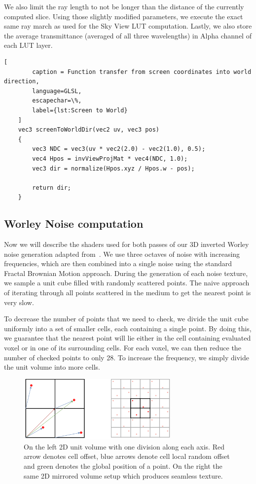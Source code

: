 \documentclass{ctuthesis}
\begin{document}
    We also limit the ray length to not be longer than the distance of the currently computed slice. 
    Using those slightly modified parameters, we execute the exact same ray march as used for the Sky View LUT
    computation. Lastly, we also store the average transmittance (averaged of all three wavelengths)
    in Alpha channel of each LUT layer. 

    \begin{lstlisting}[ 
        caption = Function transfer from screen coordinates into world direction,
        language=GLSL,
        escapechar=\%,
        label={lst:Screen to World}
    ]
    vec3 screenToWorldDir(vec2 uv, vec3 pos)
    {
        vec3 NDC = vec3(uv * vec2(2.0) - vec2(1.0), 0.5);
        vec4 Hpos = invViewProjMat * vec4(NDC, 1.0);
        vec3 dir = normalize(Hpos.xyz / Hpos.w - pos);

        return dir;
    }
    \end{lstlisting}
\subsection{Worley Noise computation}
Now we will describe the shaders used for both passes of our 3D inverted Worley noise generation adapted
from~\cite{lague_2019}. We use three octaves of noise with increasing frequencies, which are then
combined into a single noise using the standard Fractal Brownian Motion approach. During the generation
of each noise texture, we sample a unit cube filled with randomly scattered points. The naive approach 
of iterating through all points scattered in the medium to get the nearest point is very slow. 

To decrease the number of points that we need to check, we divide the unit cube uniformly into a set of smaller
cells, each containing a single point. By doing this, we guarantee that the nearest point will lie either in
the cell containing evaluated voxel or in one of its surrounding cells. For each voxel, we can then reduce the
number of checked points to only 28. To increase the frequency, we simply divide the unit volume into more cells. 

\begin{figure}
        \includegraphics[width=0.7\textwidth]{media/Random_point_generation_worley.png}
        \caption[Worley offsets and mirroring]{On the left 2D unit volume with one division along each axis. Red arrow
            denotes cell offset, blue arrows denote cell local random offset and green
            denotes the global position of a point. On the right the same 2D mirrored volume 
            setup which produces seamless texture.}
        \label{fig:worley points distribution}
\end{figure}
\end{document}
